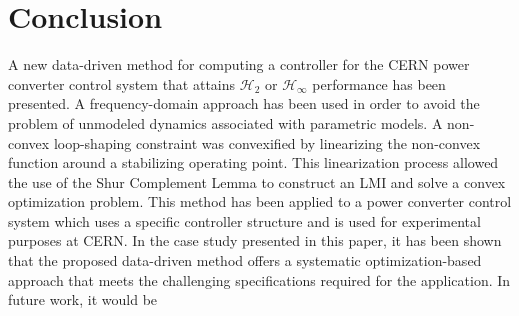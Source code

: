 \documentclass[a4paper, 10pt, conference]{ieeeconf}
\begin{document}
\section{Conclusion}
\label{sec:conclusion}
A new data-driven method for computing a controller for the CERN power converter control system that attains $\mathcal{H}_2$ or $\mathcal{H}_{\infty}$ performance has been presented. A frequency-domain approach has been used in order to avoid the problem of unmodeled dynamics associated with parametric models. A non-convex loop-shaping constraint was convexified by linearizing the non-convex function around a stabilizing operating point. This linearization process allowed the use of the Shur Complement Lemma to construct an LMI and solve a convex optimization problem. This method has been applied to a power converter control system which uses a specific controller structure and is used for experimental purposes at CERN. In the case study presented in this paper, it has been shown that the proposed data-driven method offers a systematic optimization-based approach that meets the challenging specifications required for the application. In future work, it would be 



\end{document}
